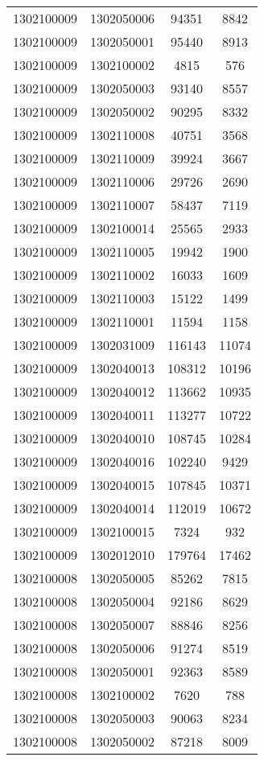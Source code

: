 \begin{longtable}[h]{llcc}
		1302100009 & 1302050006 & 94351 & 8842\\
		1302100009 & 1302050001 & 95440 & 8913\\
		1302100009 & 1302100002 & 4815 & 576\\
		1302100009 & 1302050003 & 93140 & 8557\\
		1302100009 & 1302050002 & 90295 & 8332\\
		1302100009 & 1302110008 & 40751 & 3568\\
		1302100009 & 1302110009 & 39924 & 3667\\
		1302100009 & 1302110006 & 29726 & 2690\\
		1302100009 & 1302110007 & 58437 & 7119\\
		1302100009 & 1302100014 & 25565 & 2933\\
		1302100009 & 1302110005 & 19942 & 1900\\
		1302100009 & 1302110002 & 16033 & 1609\\
		1302100009 & 1302110003 & 15122 & 1499\\
		1302100009 & 1302110001 & 11594 & 1158\\
		1302100009 & 1302031009 & 116143 & 11074\\
		1302100009 & 1302040013 & 108312 & 10196\\
		1302100009 & 1302040012 & 113662 & 10935\\
		1302100009 & 1302040011 & 113277 & 10722\\
		1302100009 & 1302040010 & 108745 & 10284\\
		1302100009 & 1302040016 & 102240 & 9429\\
		1302100009 & 1302040015 & 107845 & 10371\\
		1302100009 & 1302040014 & 112019 & 10672\\
		1302100009 & 1302100015 & 7324 & 932\\
		1302100009 & 1302012010 & 179764 & 17462\\
		1302100008 & 1302050005 & 85262 & 7815\\
		1302100008 & 1302050004 & 92186 & 8629\\
		1302100008 & 1302050007 & 88846 & 8256\\
		1302100008 & 1302050006 & 91274 & 8519\\
		1302100008 & 1302050001 & 92363 & 8589\\
		1302100008 & 1302100002 & 7620 & 788\\
		1302100008 & 1302050003 & 90063 & 8234\\
		1302100008 & 1302050002 & 87218 & 8009\\

\end{longtable}
